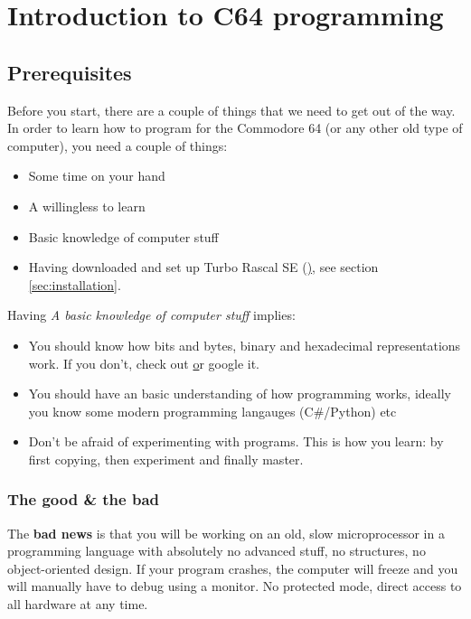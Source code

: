 \setchapterpreamble[u]{\margintoc}
\chapter{Introduction to C64 programming}
\section{Prerequisites}
Before you start, there are a couple of things that we need to get out of the way. In order to learn how to program for the Commodore 64 (or any other old type of computer), you need a couple of things:
\begin{itemize}
\item Some time on your hand
\item A willingless to learn
\item Basic knowledge of computer stuff
\item Having downloaded and set up Turbo Rascal SE  (\href{https://lemonspawn.com/turbo-rascal-syntax-error-expected-but-begin/turbo-rascal-se-tutorials/setup-and-introduction}), see section \ref{sec:installation}.
\end{itemize}
Having \textit{A basic knowledge of computer stuff} implies:
\begin{itemize}
\item You should know how bits and bytes, binary and hexadecimal representations work. If you don't, check out \href{https://computer.howstuffworks.com/bytes.htm} or google it. 
\item You should have an basic understanding of how programming works, ideally you know some modern programming langauges (C\#/Python) etc
\item Don't be afraid of experimenting with programs. This is how you learn: by first copying, then experiment and finally master. 
\end{itemize}
\subsection{The good \& the bad}
The \textbf{bad news} is that you will be working on an old, slow microprocessor in a programming language with absolutely no advanced stuff, no structures, no object-oriented design. If your program crashes, the computer will freeze and you will manually have to debug using a monitor. No protected mode, direct access to all hardware at any time.

